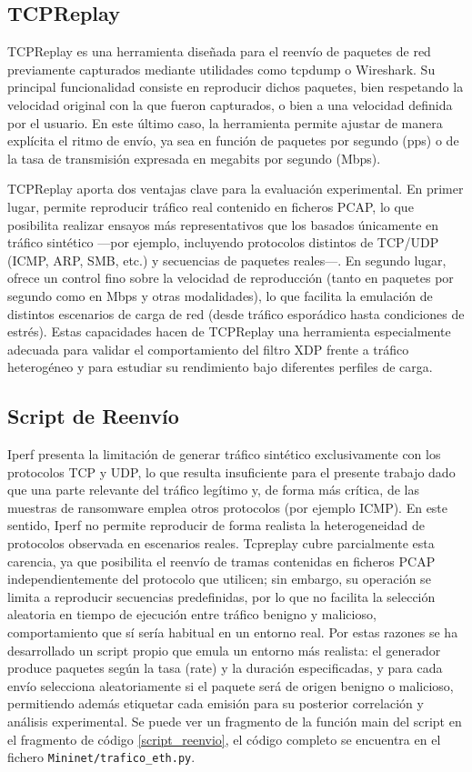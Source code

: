 \subsection{TCPReplay}

TCPReplay es una herramienta diseñada para el reenvío de paquetes de red previamente capturados mediante utilidades como tcpdump o Wireshark. Su principal funcionalidad consiste en reproducir dichos paquetes, bien respetando la velocidad original con la que fueron capturados, o bien a una velocidad definida por el usuario. En este último caso, la herramienta permite ajustar de manera explícita el ritmo de envío, ya sea en función de paquetes por segundo (pps) o de la tasa de transmisión expresada en megabits por segundo (Mbps)\cite{tcpreplay-manpage}.

TCPReplay aporta dos ventajas clave para la evaluación experimental. En primer lugar, permite reproducir tráfico real contenido en ficheros PCAP, lo que posibilita realizar ensayos más representativos que los basados únicamente en tráfico sintético —por ejemplo, incluyendo protocolos distintos de TCP/UDP (ICMP, ARP, SMB, etc.) y secuencias de paquetes reales—. En segundo lugar, ofrece un control fino sobre la velocidad de reproducción (tanto en paquetes por segundo como en Mbps y otras modalidades), lo que facilita la emulación de distintos escenarios de carga de red (desde tráfico esporádico hasta condiciones de estrés). Estas capacidades hacen de TCPReplay una herramienta especialmente adecuada para validar el comportamiento del filtro XDP frente a tráfico heterogéneo y para estudiar su rendimiento bajo diferentes perfiles de carga.

\subsection{Script de Reenvío}

Iperf presenta la limitación de generar tráfico sintético exclusivamente con los protocolos TCP y UDP, lo que resulta insuficiente para el presente trabajo dado que una parte relevante del tráfico legítimo y, de forma más crítica, de las muestras de ransomware emplea otros protocolos (por ejemplo ICMP). En este sentido, Iperf no permite reproducir de forma realista la heterogeneidad de protocolos observada en escenarios reales. Tcpreplay cubre parcialmente esta carencia, ya que posibilita el reenvío de tramas contenidas en ficheros PCAP independientemente del protocolo que utilicen; sin embargo, su operación se limita a reproducir secuencias predefinidas, por lo que no facilita la selección aleatoria en tiempo de ejecución entre tráfico benigno y malicioso, comportamiento que sí sería habitual en un entorno real. Por estas razones se ha desarrollado un script propio que emula un entorno más realista: el generador produce paquetes según la tasa (rate) y la duración especificadas, y para cada envío selecciona aleatoriamente si el paquete será de origen benigno o malicioso, permitiendo además etiquetar cada emisión para su posterior correlación y análisis experimental. Se puede ver un fragmento de la función main del script en el fragmento de código \ref{script_reenvio}, el código completo se encuentra en el fichero \verb|Mininet/trafico_eth.py|.

